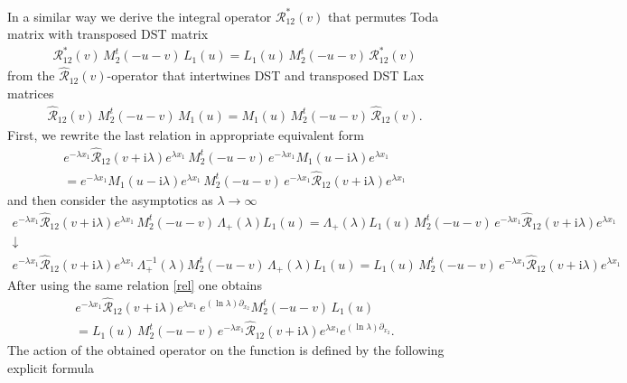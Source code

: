 \documentclass[11pt]{article}
\numberwithin{equation}{section}
\theoremstyle{plain}
\theoremstyle{definition}
\renewcommand{\imath}{\mathrm{i}}
\begin{document}
In a similar way we derive the integral operator 
$\mathcal{R}^*_{12}(v)$ that permutes Toda matrix with transposed DST matrix
\begin{align}
	\mathcal{R}^*_{12}(v) \, M^t_2(-u-v) \, L_1(u) = L_1(u ) \, M^t_2(-u-v) \, \mathcal{R}^*_{12}(v) 
\end{align}
from the $\widehat{\mathcal{R}}_{12}(v)$-operator that intertwines 
DST and transposed DST Lax matrices 
\begin{align*}
	\widehat{\mathcal{R}}_{12}(v) \, M_2^t(-u-v) \, M_1(u) = 
	M_1(u) \, M_2^t(-u-v) \, \widehat{\mathcal{R}}_{12}(v).
\end{align*}
First, we rewrite the last relation in appropriate equivalent form  
\begin{multline*}
	e^{-\lambda x_1}\widehat{\mathcal{R}}_{12}(v+\imath\lambda)e^{\lambda x_1} \, 
	M_2^t(-u-v) \, e^{-\lambda x_1}M_1(u-\imath\lambda)e^{\lambda x_1} \\ 
	= 
	e^{-\lambda x_1}M_1(u-\imath\lambda)e^{\lambda x_1}  \, M_2^t(-u-v) \, 
	e^{-\lambda x_1}\widehat{\mathcal{R}}_{12}(v+\imath\lambda)e^{\lambda x_1} 
\end{multline*}
and then consider the asymptotics as $\lambda \to \infty$
\begin{gather*}
	e^{-\lambda x_1}\widehat{\mathcal{R}}_{12}(v+\imath\lambda)e^{\lambda x_1} \, 
	M_2^t(-u-v) \, \Lambda_+(\lambda)L_1(u) = 
	\Lambda_+(\lambda)L_1(u)\, M_2^t(-u-v) \, 
	e^{-\lambda x_1}\widehat{\mathcal{R}}_{12}(v+\imath\lambda)e^{\lambda x_1} \\ 
	\downarrow \\
	e^{-\lambda x_1}\widehat{\mathcal{R}}_{12}(v+\imath\lambda)e^{\lambda x_1} \, 
	\Lambda^{-1}_+(\lambda)M_2^t(-u-v) \, \Lambda_+(\lambda)L_1(u) = 
	L_1(u)\, M_2^t(-u-v) \, 
	e^{-\lambda x_1}\widehat{\mathcal{R}}_{12}(v+\imath\lambda)e^{\lambda x_1}
\end{gather*}
After using the same relation \eqref{rel} one obtains 
\begin{multline*} 
	e^{-\lambda x_1}\widehat{\mathcal{R}}_{12}(v+\imath\lambda)e^{\lambda x_1} \, 
	e^{(\ln\lambda)\partial_{x_2}}M_2^t(-u-v)\,L_1(u)  \\ = 
	L_1(u)\, M_2^t(-u-v) \, 
	e^{-\lambda x_1}\widehat{\mathcal{R}}_{12}(v+\imath\lambda)e^{\lambda x_1}e^{(\ln\lambda)\partial_{x_2}}.
\end{multline*}
The action of the obtained operator on the function is defined 
by the following explicit formula
\end{document}
